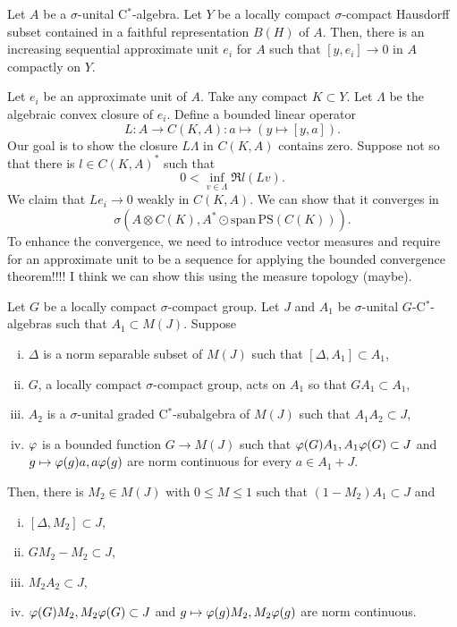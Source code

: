 \documentclass{../../large}
\begin{document}
\begin{prb}
Let $A$ be a $\sigma$-unital C$^*$-algebra.
Let $Y$ be a locally compact $\sigma$-compact Hausdorff subset contained in a faithful representation $B(H)$ of $A$.
Then, there is an increasing sequential approximate unit $e_i$ for $A$ such that $[y,e_i]\to0$ in $A$ compactly on $Y$.
\end{prb}
\begin{pf}
Let $e_i$ be an approximate unit of $A$.
Take any compact $K\subset Y$.
Let $\Lambda$ be the algebraic convex closure of $e_i$.
Define a bounded linear operator
\[L:A\to C(K,A):a\mapsto(y\mapsto[y,a]).\]
Our goal is to show the closure $L\Lambda$ in $C(K,A)$ contains zero.
Suppose not so that there is $l\in C(K,A)^*$ such that
\[0<\inf_{v\in\Lambda}\Re l(Lv).\]
We claim that $Le_i\to0$ weakly in $C(K,A)$.
We can show that it converges in
\[\sigma(A\otimes C(K),A^*\odot\mathrm{span}\,\mathrm{PS}(C(K))).\]
To enhance the convergence, we need to introduce vector measures and require for an approximate unit to be a sequence for applying the bounded convergence theorem!!!!
I think we can show this using the measure topology (maybe).
\end{pf}

\begin{prb}
Let $G$ be a locally compact $\sigma$-compact group.
Let $J$ and $A_1$ be $\sigma$-unital $G$-C$^*$-algebras such that $A_1\subset M(J)$.
Suppose
\begin{enumerate}[(i)]
\item $\Delta$ is a norm separable subset of $M(J)$ such that $[\Delta,A_1]\subset A_1$,
\item $G$, a locally compact $\sigma$-compact group, acts on $A_1$ so that $GA_1\subset A_1$,
\item $A_2$ is a $\sigma$-unital graded C$^*$-subalgebra of $M(J)$ such that $A_1A_2\subset J$,
\item $\varphi$ is a bounded function $G\to M(J)$ such that $\varphi(G)A_1,A_1\varphi(G)\subset J$ and $g\mapsto\varphi(g)a,a\varphi(g)$ are norm continuous for every $a\in A_1+J$.
\end{enumerate}
Then, there is $M_2\in M(J)$ with $0\le M\le1$ such that $(1-M_2)A_1\subset J$ and
\begin{enumerate}[(i)]
\item $[\Delta,M_2]\subset J$,
\item $GM_2-M_2\subset J$,
\item $M_2A_2\subset J$,
\item $\varphi(G)M_2,M_2\varphi(G)\subset J$ and $g\mapsto\varphi(g)M_2,M_2\varphi(g)$ are norm continuous.
\end{enumerate}
\end{prb}
\begin{pf}




\end{pf}
\end{document}
